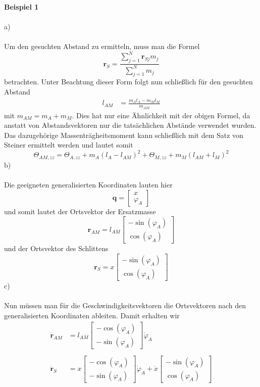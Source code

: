 \textbf{Beispiel 1}\\ \\
a)\\ \\
Um den gesuchten Abstand zu ermitteln, muss man die Formel
\[
	\textbf{r}_S = \frac{\sum_{j=1}^{N}\textbf{r}_{Sj}m_j}{\sum_{j=1}^{N}m_j}
\]
betrachten. Unter Beachtung dieser Form folgt nun schließlich für den gesuchten Abstand
\begin{align*}
	l_{AM} &= \frac{m_Al_A - m_Ml_M}{m_{AM}} 
\end{align*}
mit $m_{AM} = m_A + m_M$. Dies hat nur eine Ähnlichkeit mit der obigen Formel, da anstatt von Abstandsvektoren nur die tatsächlichen Abstände verwendet wurden. Das dazugehörige Massenträgheitsmoment kann schließlich mit dem Satz von Steiner ermittelt werden und lautet somit
\[
	\varTheta_{AM,zz} = \varTheta_{A,zz} + m_A(l_A - l_{AM})^2 + \varTheta_{M,zz} + m_M(l_{AM} + l_M)^2
\]
b)\\ \\
Die geeigneten generalisierten Koordinaten lauten hier
\[
	\textbf{q} = \begin{bmatrix}
		x \\
		\varphi_A
	\end{bmatrix}
\]
und somit lautet der Ortsvektor der Ersatzmasse
\[
	\textbf{r}_{AM} = l_{AM}\begin{bmatrix}
		-\sin(\varphi_A) \\
		\cos(\varphi_A)
	\end{bmatrix}
\]
und der Ortsvektor des Schlittens
\[
	\textbf{r}_S = x\begin{bmatrix}
		-\sin(\varphi_A) \\
		\cos(\varphi_A)
	\end{bmatrix}
\]
c)\\ \\
Nun müssen man für die Geschwindigkeitsvektoren die Ortsvektoren nach den generalisierten Koordinaten ableiten. Damit erhalten wir
\begin{align*}
	\dot{\textbf{r}}_{AM} &= l_{AM}\begin{bmatrix}
		-\cos(\varphi_A) \\
		-\sin(\varphi_A)
	\end{bmatrix}\dot{\varphi}_A
	\\ \\
	\dot{\textbf{r}}_S &= x\begin{bmatrix}
		-\cos(\varphi_A) \\
		-\sin(\varphi_A)
	\end{bmatrix}\dot{\varphi}_A
	+\dot{x}
	\begin{bmatrix}
		-\sin(\varphi_A) \\
		\cos(\varphi_A)
	\end{bmatrix}
\end{align*}
